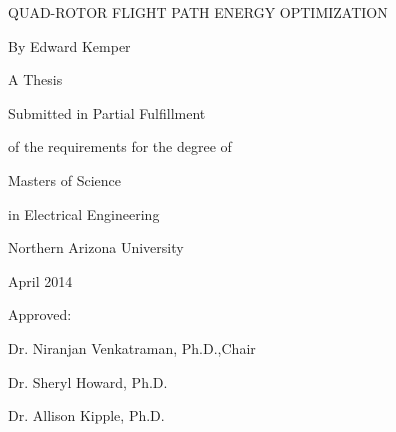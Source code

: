 \documentclass[12pt, letterpaper, oneside]{Thesis} %
\title{\ttitle} %
\begin{document}
\frontmatter %


\fancyhead{} %
\rhead{\thepage} %
\lhead{} %

\pagestyle{plain} %

\newcommand{\HRule}{\rule{\linewidth}{0.5mm}} %
\newcommand{\p}{\partial}
\newcommand{\spa}{\text{ }}
\newcommand{\cc}{\mathfrak{C}} %
\hypersetup{pdfsubject=\subjectname}
\hypersetup{pdfauthor=\authornames}
\hypersetup{pdfkeywords=\keywordnames}


\begin{titlepage}
\begin{center}

QUAD-ROTOR FLIGHT PATH ENERGY OPTIMIZATION
\vspace{15 mm}

By Edward Kemper

A Thesis

Submitted in Partial Fulfillment

of the requirements for the degree of

Masters of Science

in Electrical Engineering
\vspace{15 mm}

Northern Arizona University

April 2014
\vspace{20 mm}

Approved:

Dr. Niranjan Venkatraman, Ph.D.,Chair

Dr. Sheryl Howard, Ph.D.

Dr. Allison Kipple, Ph.D.




\vfill
\end{center}

\end{titlepage}
\end{document}
